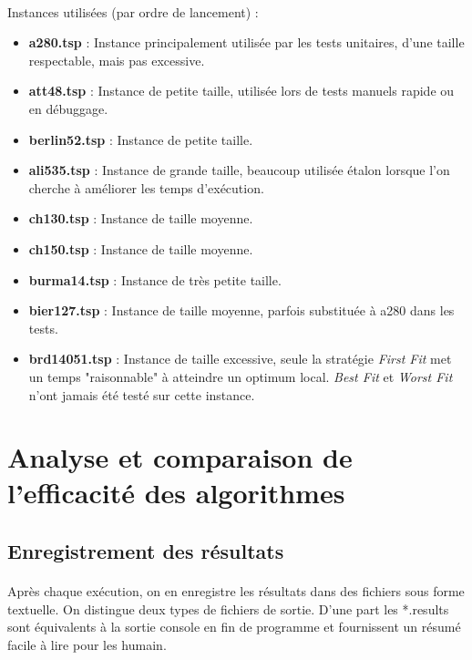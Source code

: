 \documentclass[a4paper,10pt]{report}
\begin{document}
\paragraph{}
Instances utilisées (par ordre de lancement) :
\begin{itemize}
  \item \textbf{a280.tsp} : Instance principalement utilisée par les tests
unitaires, d'une taille respectable, mais pas excessive.
  \item \textbf{att48.tsp} : Instance de petite taille, utilisée lors de tests
manuels rapide ou en débuggage.
  \item \textbf{berlin52.tsp} : Instance de petite taille.
  \item \textbf{ali535.tsp} : Instance de grande taille, beaucoup utilisée
étalon lorsque l'on cherche à améliorer les temps d'exécution.
  \item \textbf{ch130.tsp} : Instance de taille moyenne.
  \item \textbf{ch150.tsp} : Instance de taille moyenne.
  \item \textbf{burma14.tsp} : Instance de très petite taille.
  \item \textbf{bier127.tsp} : Instance de taille moyenne, parfois substituée à
a280 dans les tests.
  \item \textbf{brd14051.tsp} : Instance de taille excessive, seule la stratégie
\textit{First Fit} met un temps "raisonnable" à atteindre un optimum local.
\textit{Best Fit} et \textit{Worst Fit} n'ont jamais été testé sur cette
instance.
\end{itemize}

\pagebreak
\section{Analyse et comparaison de l'efficacité des algorithmes}
\subsection{Enregistrement des résultats}

\paragraph{}
  Après chaque exécution, on en enregistre les résultats dans des fichiers sous
forme textuelle. On distingue deux types de fichiers de sortie. D'une part les
*.results sont équivalents à la sortie console en fin de programme et
fournissent un résumé facile à lire pour les humain.
\end{document}
